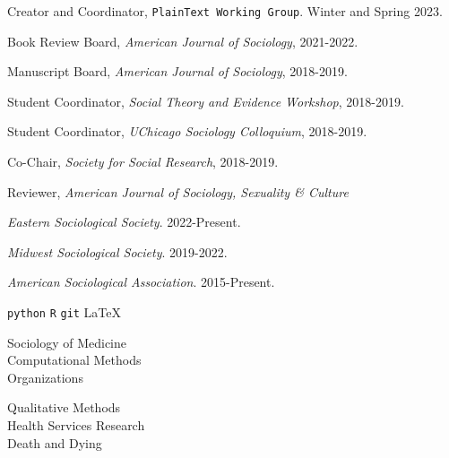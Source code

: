 \documentclass[11pt,article,oneside]{memoir}
\begin{document}


\normalsize

\newpage

\medskip
{}
\medskip

\ind Creator and Coordinator, \texttt{PlainText Working Group}. Winter and Spring 2023.

\ind Book Review Board, \emph{American Journal of Sociology}, 2021-2022.

\ind Manuscript Board, \emph{American Journal of Sociology}, 2018-2019.

\ind Student Coordinator, \emph{Social Theory and Evidence Workshop}, 2018-2019.

\ind Student Coordinator, \emph{UChicago Sociology Colloquium}, 2018-2019.

\ind Co-Chair, \emph{Society for Social Research}, 2018-2019.

\ind Reviewer, \emph{American Journal of Sociology, Sexuality \& Culture}

\medskip
{}
\medskip

\ind \emph{Eastern Sociological Society}. 2022-Present.

\ind \emph{Midwest Sociological Society}. 2019-2022.

\ind \emph{American Sociological Association}. 2015-Present.

\bigskip
{}

\medskip

\ind \texttt{python} \hspace{0.4in}  \texttt{R} \hspace{0.4in} \texttt{git} \hspace{0.4in} \LaTeX

\medskip
{}
\bigskip

\vskip 25pt

\begin{minipage}{\textwidth}
	\begin{minipage}{0.48\textwidth}
	Sociology of Medicine \\ Computational Methods \\ Organizations
	\end{minipage}\hfill
	\begin{minipage}{0.52\textwidth}
	Qualitative Methods \\ Health Services Research \\ Death and Dying
	\end{minipage}%
\end{minipage}
\end{document}
